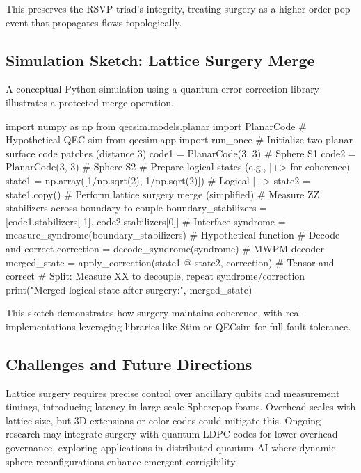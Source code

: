 \documentclass[12pt]{article}
\begin{document}
This preserves the RSVP triad's integrity, treating surgery as a higher-order pop event that propagates flows topologically.

\subsection{Simulation Sketch: Lattice Surgery Merge}
A conceptual Python simulation using a quantum error correction library illustrates a protected merge operation.

\begin{codeblock}
import numpy as np
from qecsim.models.planar import PlanarCode # Hypothetical QEC sim
from qecsim.app import run_once
# Initialize two planar surface code patches (distance 3)
code1 = PlanarCode(3, 3) # Sphere S1
code2 = PlanarCode(3, 3) # Sphere S2
# Prepare logical states (e.g., |+> for coherence)
state1 = np.array([1/np.sqrt(2), 1/np.sqrt(2)]) # Logical |+>
state2 = state1.copy()
# Perform lattice surgery merge (simplified)
# Measure ZZ stabilizers across boundary to couple
boundary_stabilizers = [code1.stabilizers[-1], code2.stabilizers[0]] # Interface
syndrome = measure_syndrome(boundary_stabilizers) # Hypothetical function
# Decode and correct
correction = decode_syndrome(syndrome) # MWPM decoder
merged_state = apply_correction(state1 @ state2, correction) # Tensor and correct
# Split: Measure XX to decouple, repeat syndrome/correction
print("Merged logical state after surgery:", merged_state)
\end{codeblock}

This sketch demonstrates how surgery maintains coherence, with real implementations leveraging libraries like Stim or QECsim for full fault tolerance.

\subsection{Challenges and Future Directions}
Lattice surgery requires precise control over ancillary qubits and measurement timings, introducing latency in large-scale Spherepop foams. Overhead scales with lattice size, but 3D extensions or color codes could mitigate this. Ongoing research may integrate surgery with quantum LDPC codes for lower-overhead governance, exploring applications in distributed quantum AI where dynamic sphere reconfigurations enhance emergent corrigibility.

\end{document}

